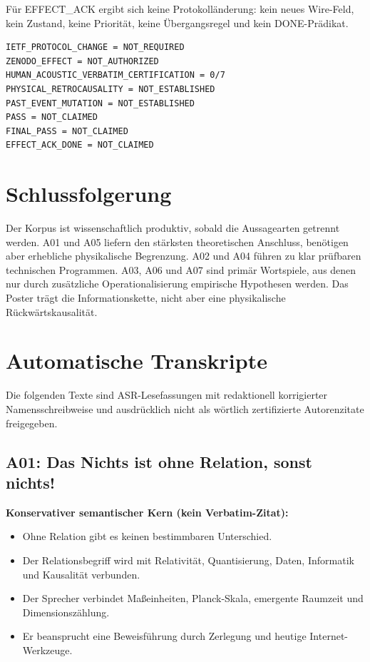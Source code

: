 \documentclass[11pt,a4paper]{article}
\begin{document}
Für EFFECT\_ACK ergibt sich keine Protokolländerung: kein neues Wire-Feld, kein Zustand, keine Priorität, keine Übergangsregel und kein DONE-Prädikat.

\begin{verbatim}
IETF_PROTOCOL_CHANGE = NOT_REQUIRED
ZENODO_EFFECT = NOT_AUTHORIZED
HUMAN_ACOUSTIC_VERBATIM_CERTIFICATION = 0/7
PHYSICAL_RETROCAUSALITY = NOT_ESTABLISHED
PAST_EVENT_MUTATION = NOT_ESTABLISHED
PASS = NOT_CLAIMED
FINAL_PASS = NOT_CLAIMED
EFFECT_ACK_DONE = NOT_CLAIMED
\end{verbatim}

\section{Schlussfolgerung}
Der Korpus ist wissenschaftlich produktiv, sobald die Aussagearten getrennt werden. A01 und A05 liefern den stärksten theoretischen Anschluss, benötigen aber erhebliche physikalische Begrenzung. A02 und A04 führen zu klar prüfbaren technischen Programmen. A03, A06 und A07 sind primär Wortspiele, aus denen nur durch zusätzliche Operationalisierung empirische Hypothesen werden. Das Poster trägt die Informationskette, nicht aber eine physikalische Rückwärtskausalität.

\appendix
\section{Automatische Transkripte}
Die folgenden Texte sind ASR-Lesefassungen mit redaktionell korrigierter Namensschreibweise und ausdrücklich nicht als wörtlich zertifizierte Autorenzitate freigegeben.

\subsection{A01: Das Nichts ist ohne Relation, sonst nichts!}
\label{sec:a01}
\textbf{Konservativer semantischer Kern (kein Verbatim-Zitat):}
\begin{itemize}
\item Ohne Relation gibt es keinen bestimmbaren Unterschied.
\item Der Relationsbegriff wird mit Relativität, Quantisierung, Daten, Informatik und Kausalität verbunden.
\item Der Sprecher verbindet Maßeinheiten, Planck-Skala, emergente Raumzeit und Dimensionszählung.
\item Er beansprucht eine Beweisführung durch Zerlegung und heutige Internet-Werkzeuge.
\end{itemize}
\end{document}

